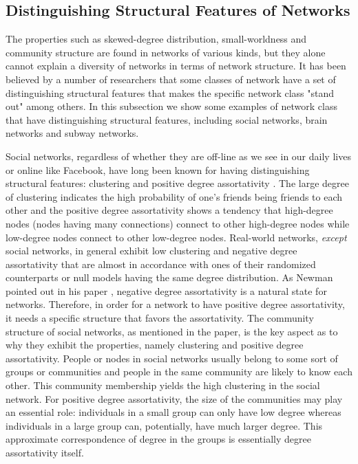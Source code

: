 	
	
	\subsection{Distinguishing Structural Features of Networks}
The properties such as skewed-degree distribution, small-worldness and community structure are found in networks of various kinds, but they alone cannot explain a diversity of networks in terms of network structure. It has been believed by a number of researchers that some classes of network have a set of distinguishing structural features that makes the specific network class "stand out" among others. In this subsection we show some examples of network class that have distinguishing structural features, including social networks, brain networks and subway networks.

Social networks, regardless of whether they are off-line as we see in our daily lives or online like Facebook, have long been known for having  distinguishing structural features: clustering and positive degree assortativity \cite{AssortativeMixing,WhySocialNetworks, Mislove:2007:OnlineSocial}. The large degree of clustering indicates the high probability of one's friends being friends to each other and the positive degree assortativity shows a tendency that high-degree nodes (nodes having many connections) connect to other high-degree nodes while low-degree nodes connect to other low-degree nodes. Real-world networks, \textit{except} social networks, in general exhibit low clustering and negative degree assortativity that are almost in accordance with ones of their randomized counterparts or null models having the same degree distribution. As Newman pointed out in his paper \cite{WhySocialNetworks}, negative degree assortativity is a natural state for networks. Therefore, in order for a network to have positive degree assortativity, it needs a specific structure that favors the assortativity. The community structure of social networks, as mentioned in the paper, is the key aspect as to why they exhibit the properties, namely clustering and positive degree assortativity. People or nodes in social networks usually belong to some sort of groups or communities and people in the same community are likely to know each other. This community membership yields the high clustering in the social network.  For positive degree assortativity, the size of the communities may play an essential role: individuals in a small group can only have low degree whereas individuals in a large group can, potentially, have much larger degree. This approximate correspondence of degree in the groups is essentially degree assortativity itself.


